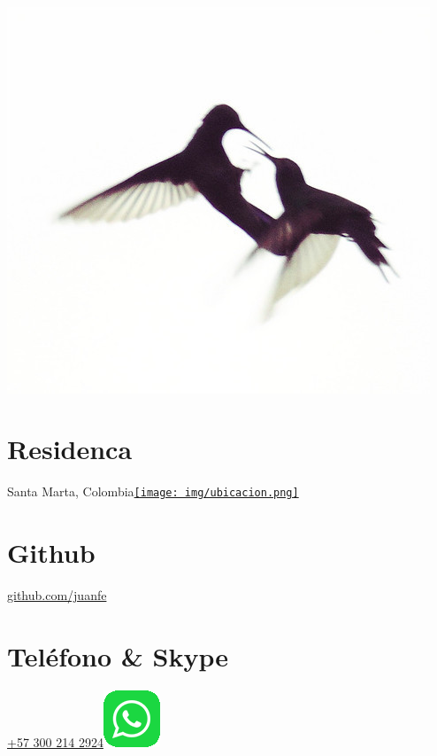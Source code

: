 \begin{aside}
    ~
    ~
    ~
    ~
    ~
    ~
  \includegraphics[scale=0.8]{img/coruscan.jpg}
    ~
  \section{Residenca}
	Santa Marta, Colombia\href{https://www.google.com/maps/place/Laureles+-+Estadio,+Medell%C3%ADn,+Laureles,+Medell%C3%ADn,+Antioquia/@6.2546395,-75.6144257,14}{\texttt{[image: img/ubicacion.png]}}
    ~
    ~
  \section{Github}
    \href{https://github.com/juanfe}{github.com/juanfe}
  \section{Teléfono \& Skype}
    \href{callto:+573002142924}{+57 300 214 2924\includegraphics[scale=0.15]{img/whatsapp.png}}
    ~
    ~

\end{aside}
